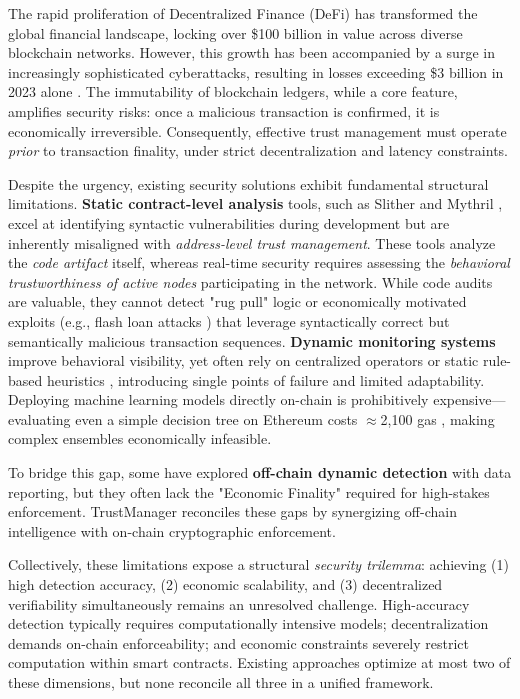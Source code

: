 \documentclass[runningheads]{llncs}
\begin{document}
The rapid proliferation of Decentralized Finance (DeFi) has transformed the global financial landscape, locking over \$100 billion in value across diverse blockchain networks. However, this growth has been accompanied by a surge in increasingly sophisticated cyberattacks, resulting in losses exceeding \$3 billion in 2023 alone \cite{zhou2022sok,qin2021attacking}. The immutability of blockchain ledgers, while a core feature, amplifies security risks: once a malicious transaction is confirmed, it is economically irreversible. Consequently, effective trust management must operate \textit{prior} to transaction finality, under strict decentralization and latency constraints.

Despite the urgency, existing security solutions exhibit fundamental structural limitations. \textbf{Static contract-level analysis} tools, such as Slither \cite{feist2019slither} and Mythril \cite{mueller2018mythril}, excel at identifying syntactic vulnerabilities during development but are inherently misaligned with \textit{address-level trust management}. These tools analyze the \textit{code artifact} itself, whereas real-time security requires assessing the \textit{behavioral trustworthiness of active nodes} participating in the network. While code audits are valuable, they cannot detect "rug pull" logic or economically motivated exploits (e.g., flash loan attacks \cite{qin2021attacking}) that leverage syntactically correct but semantically malicious transaction sequences. \textbf{Dynamic monitoring systems} improve behavioral visibility, yet often rely on centralized operators or static rule-based heuristics \cite{forta2021}, introducing single points of failure and limited adaptability. Deploying machine learning models directly on-chain is prohibitively expensive—evaluating even a simple decision tree on Ethereum costs $\approx$2,100 gas \cite{modulus2023cost}, making complex ensembles economically infeasible. 

To bridge this gap, some have explored \textbf{off-chain dynamic detection} with data reporting, but they often lack the "Economic Finality" required for high-stakes enforcement. TrustManager reconciles these gaps by synergizing off-chain intelligence with on-chain cryptographic enforcement.

Collectively, these limitations expose a structural \textit{security trilemma}: achieving (1) high detection accuracy, (2) economic scalability, and (3) decentralized verifiability simultaneously remains an unresolved challenge. High-accuracy detection typically requires computationally intensive models; decentralization demands on-chain enforceability; and economic constraints severely restrict computation within smart contracts. Existing approaches optimize at most two of these dimensions, but none reconcile all three in a unified framework.
\end{document}
